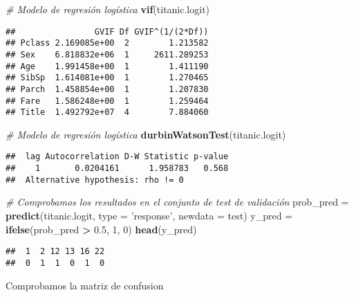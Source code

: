 \documentclass[]{article}
\newenvironment{Shaded}{\begin{snugshade}}{\end{snugshade}}
\newcommand{\KeywordTok}[1]{\textcolor[rgb]{0.13,0.29,0.53}{\textbf{#1}}}
\newcommand{\DataTypeTok}[1]{\textcolor[rgb]{0.13,0.29,0.53}{#1}}
\newcommand{\DecValTok}[1]{\textcolor[rgb]{0.00,0.00,0.81}{#1}}
\newcommand{\FloatTok}[1]{\textcolor[rgb]{0.00,0.00,0.81}{#1}}
\newcommand{\StringTok}[1]{\textcolor[rgb]{0.31,0.60,0.02}{#1}}
\newcommand{\CommentTok}[1]{\textcolor[rgb]{0.56,0.35,0.01}{\textit{#1}}}
\newcommand{\OperatorTok}[1]{\textcolor[rgb]{0.81,0.36,0.00}{\textbf{#1}}}
\newcommand{\NormalTok}[1]{#1}
\begin{document}
\begin{Shaded}
\begin{Highlighting}[]
\CommentTok{# Modelo de regresión logística}
\KeywordTok{vif}\NormalTok{(titanic.logit)}
\end{Highlighting}
\end{Shaded}

\begin{verbatim}
##                GVIF Df GVIF^(1/(2*Df))
## Pclass 2.169085e+00  2        1.213582
## Sex    6.818832e+06  1     2611.289253
## Age    1.991458e+00  1        1.411190
## SibSp  1.614081e+00  1        1.270465
## Parch  1.458854e+00  1        1.207830
## Fare   1.586248e+00  1        1.259464
## Title  1.492792e+07  4        7.884060
\end{verbatim}

\begin{Shaded}
\begin{Highlighting}[]
\CommentTok{# Modelo de regresión logística}
\KeywordTok{durbinWatsonTest}\NormalTok{(titanic.logit)}
\end{Highlighting}
\end{Shaded}

\begin{verbatim}
##  lag Autocorrelation D-W Statistic p-value
##    1       0.0204161      1.958783   0.568
##  Alternative hypothesis: rho != 0
\end{verbatim}

\begin{Shaded}
\begin{Highlighting}[]
\CommentTok{# Comprobamos los resultados en el conjunto de test de validación}
\NormalTok{prob_pred =}\StringTok{ }\KeywordTok{predict}\NormalTok{(titanic.logit, }\DataTypeTok{type =} \StringTok{'response'}\NormalTok{, }\DataTypeTok{newdata =}\NormalTok{ test)}
\NormalTok{y_pred =}\StringTok{ }\KeywordTok{ifelse}\NormalTok{(prob_pred }\OperatorTok{>}\StringTok{ }\FloatTok{0.5}\NormalTok{, }\DecValTok{1}\NormalTok{, }\DecValTok{0}\NormalTok{)}
\KeywordTok{head}\NormalTok{(y_pred)}
\end{Highlighting}
\end{Shaded}

\begin{verbatim}
##  1  2 12 13 16 22 
##  0  1  1  0  1  0
\end{verbatim}

Comprobamos la matriz de confusion

\begin{Shaded}
\end{Shaded}
\end{document}
